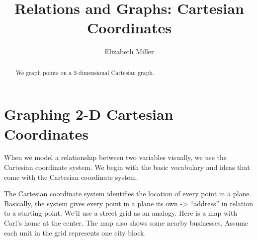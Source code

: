 \documentclass{ximera}
\author{Elizabeth Miller}
\title{Relations and Graphs: Cartesian Coordinates}
\begin{document}
\begin{abstract}
We graph points on a 2-dimensional Cartesian graph.  
\end{abstract}
\maketitle


\section{Graphing 2-D Cartesian Coordinates} 

When we model a relationship between two variables visually, we use the Cartesian coordinate system. We begin with the basic vocabulary and ideas that come with the Cartesian coordinate system.

The Cartesian coordinate system identifies the location of every point in a plane. Basically, the system gives every point in a plane its own -> ``address'' in relation to a starting point. We'll use a street grid as an analogy. Here is a map with Carl's home at the center. The map also shows some nearby businesses. Assume each unit in the grid represents one city block.

\begin{image}
\end{image}
\end{document}
